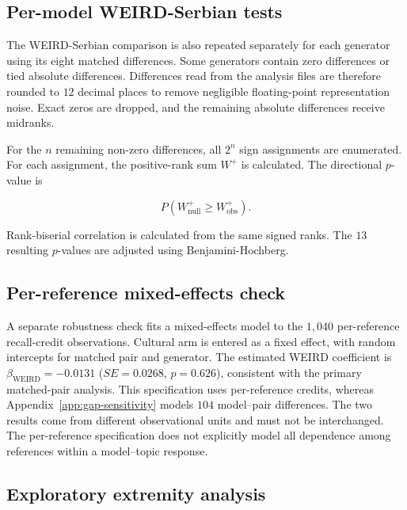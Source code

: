\documentclass[11pt,a4paper]{article}
\begin{document}
\subsection{Per-model WEIRD-Serbian tests}
\label{app:per_model_tests}

The WEIRD-Serbian comparison is also repeated separately for each generator using its eight matched differences. Some generators contain zero differences or tied absolute differences. Differences read from the analysis files are therefore rounded to $12$ decimal places to remove negligible floating-point representation noise. Exact zeros are dropped, and the remaining absolute differences receive midranks.

For the $n$ remaining non-zero differences, all $2^n$ sign assignments are enumerated. For each assignment, the positive-rank sum $W^+$ is calculated. The directional $p$-value is

\begin{equation}
 P\left(W^+_{\mathrm{null}}\geq W^+_{\mathrm{obs}}\right).
\end{equation}

Rank-biserial correlation is calculated from the same signed ranks. The $13$ resulting $p$-values are adjusted using Benjamini-Hochberg.

\subsection{Per-reference mixed-effects check}
\label{app:mixed_model}

A separate robustness check fits a mixed-effects model to the $1,040$ per-reference recall-credit observations. Cultural arm is entered as a fixed effect, with random intercepts for matched pair and generator. The estimated WEIRD coefficient is $\beta_{\mathrm{WEIRD}}=-0.0131$ ($SE=0.0268$, $p=0.626$), consistent with the primary matched-pair analysis. This specification uses per-reference credits, whereas Appendix~\ref{app:gap-sensitivity} models $104$ model--pair differences. The two results come from different observational units and must not be interchanged. The per-reference specification does not explicitly model all dependence among references within a model--topic response.

\subsection{Exploratory extremity analysis}
\label{app:extremity}
\end{document}
